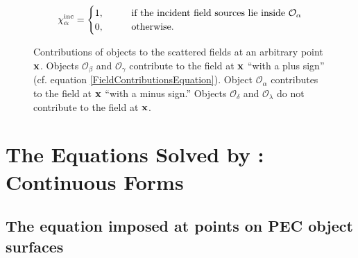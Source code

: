 \documentclass[letterpaper]{article}
\begin{document}
\begin{itemize}
        $$
         \chi^{\hbox{\scriptsize{inc}}}_\alpha
         =\begin{cases} 
            1, \qquad &\text{if the incident field sources lie inside 
                              $\mathcal{O}_\alpha$} \\
            0, \qquad &\text{otherwise.}
          \end{cases} 
        $$
        

\end{itemize}

\begin{figure}
\begin{center}
\caption{Contributions of objects to the scattered fields at 
         an arbitrary point $\mathbf{x}$. Objects $\mathcal{O}_\beta$
         and $\mathcal{O}_\gamma$ contribute
         to the field at $\mathbf{x}$ ``with a plus sign'' 
         (cf. equation \ref{FieldContributionsEquation}).
         Object $\mathcal{O}_\alpha$ 
         contributes to the field at $\mathbf{x}$ ``with a minus
         sign.'' Objects $\mathcal{O}_\delta$ and $\mathcal{O}_\lambda$
         do not contribute to the field at $\mathbf{x}$.}
\label{FieldContributionsFigure}
\end{center}
\end{figure}

\newpage
\section{The Equations Solved by \ls: Continuous Forms}

\subsection{The equation imposed at points on PEC object surfaces}
\end{document}
